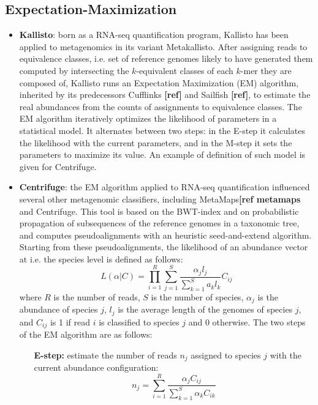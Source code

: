 \subsection{Expectation-Maximization}
\begin{itemize}
    \item \textbf{Kallisto}: born as a RNA-seq quantification program, Kallisto has been applied to metagenomics in its variant Metakallisto. After assigning reads to equivalence classes, i.e. set of reference genomes likely to have generated them computed by intersecting the $k$-equivalent classes of each $k$-mer they are composed of, Kallisto runs an Expectation Maximization (EM) algorithm, inherited by its predecessors Cufflinks \textbf{[ref]} and Sailfish  \textbf{[ref]}, to estimate the real abundances from the counts of assignments to equivalence classes. The EM algorithm iteratively optimizes the likelihood of parameters in a statistical model. It alternates between two steps: in the E-step it calculates the likelihood with the current parameters, and in the M-step it sets the parameters to maximize its value. An example of definition of such model is given for Centrifuge.
    \item \textbf{Centrifuge}: the EM algorithm applied to RNA-seq quantification influenced several other metagenomic classifiers, including MetaMaps\textbf{[ref metamaps} and Centrifuge. This tool is based on the BWT-index and on probabilistic propagation of subsequences of the reference genomes in a taxonomic tree, and computes pseudoalignments with an heuristic seed-and-extend algorithm. Starting from these pseudoalignments, the likelihood of an abundance vector at i.e. the species level is defined as follows:
    \begin{equation*}
      L(\alpha|C) = \prod_{i=1}^R \sum_{j=1}^S \frac{\alpha_j l_j}{\sum_{k=1}^S a_k l_k} C_{ij}
    \end{equation*}
    where $R$ is the number of reads, $S$ is the number of species, $\alpha_j$ is the abundance of species $j$, $l_j$ is the average length of the genomes of species $j$, and $C_{ij}$ is 1 if read $i$ is classified to species $j$ and 0 otherwise. The two steps of the EM algorithm are as follows:
    \begin{itemize}
      \item[\textbf{E-step:}] estimate the number of reads $n_j$ assigned to species $j$ with the current abundance configuration:
      \begin{equation*}
        n_j = \sum_{i=1}^R \frac{\alpha_j C_{ij}}{\sum_{k=1}^S \alpha_k C_{ik}}

\end{equation*}
\end{itemize}
\end{itemize}
